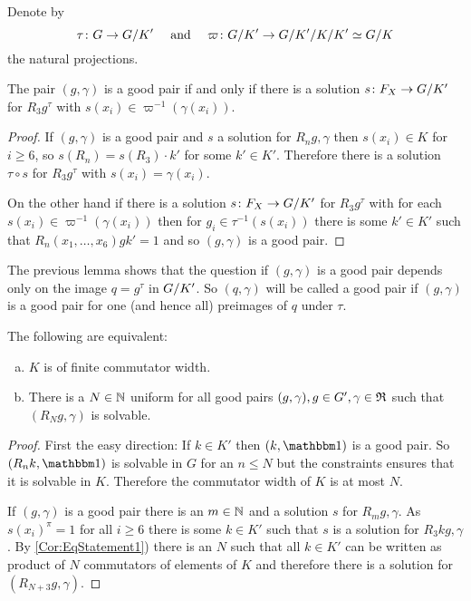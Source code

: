\documentclass[a4paper,11pt]{amsart}
\begin{document}
\begin{lem}
 Denote by 
 \[\tau\colon G\to{G/K'}\quad\text{ and }\quad\varpi\colon {G/K'} \to {{G/K'}/{K/K'}}\simeq {G/K}\]
 the natural projections.
 
 The pair $(g,\gamma)$ is a good pair if and only if there is a solution $s\colon F_X \to {G/K'}$ for $R_3g^\tau$ with $s(x_i) \in \varpi^{-1}(\gamma(x_i))$. 
\end{lem}
\begin{proof}
 If $(g,\gamma)$ is a good pair and $s$ a solution for $R_ng,\gamma$ 
 then $s(x_i)\in K$ for $i\geq6$, so $s(R_n) = s(R_3) \cdot k'$ for some $k'\in K'$. 
 Therefore there is a solution $\tau\circ s$ for $R_3g^\tau$ with $s(x_i) = \gamma(x_i)$.
 
 On the other hand if there is a solution $s\colon F_X \to {G/K'}$ for $R_3g^\tau$ with for each $s(x_i) \in \varpi^{-1}(\gamma(x_i))$ then
 for $g_i \in \tau^{-1}(s(x_i))$ there is some $k'\in K'$ such that $R_n(x_1,\ldots,x_6)gk'=1$ and so $(g,\gamma)$ is a good pair.
\end{proof}
The previous lemma shows that the question if $(g,\gamma)$ is a good pair depends only on the image $q=g^\tau$ in ${G/K'}$. So 
$(q,\gamma)$ will be called a good pair if $(g,\gamma)$ is a good pair for one (and hence all) preimages of $q$ under $\tau$.
\begin{cor}\label{cor:finiteCommutatorWidthKimpliesBoundedConstraintedCommutators}
The following are equivalent:
\begin{enumerate}[a)]
 \item $K$ is of finite commutator width. \label{Cor:EqStatement1}
 \item There is a $N\in\mathbb{N}$ uniform for all good pairs $(g,\gamma),g \in G',\gamma\in\mathfrak{R}$ such that $(R_Ng,\gamma)$ is solvable.
\end{enumerate}
\end{cor}
\begin{proof}
 First the easy direction: If $k\in K'$ then $(k,\id)$ is a good pair. So $(R_nk,\id)$ is solvable in $G$ for an $n\leq N$ but the constraints ensures that it is solvable in $K$.
 Therefore the commutator width of $K$ is at most $N$.
 
 If $(g,\gamma)$ is a good pair there is an $m\in \mathbb{N}$ and a solution $s$ for $R_mg,\gamma$. As $s(x_i)^\pi =1$ for all $i\geq 6$ there is some $k\in K'$ such that $s$ is 
 a solution for $R_3kg,\gamma$. By \ref{Cor:EqStatement1}) there is an $N$ such that all $k\in K'$ can be written as product of $N$ commutators of elements of $K$ and
 therefore there is a solution for $(R_{N+3}g,\gamma)$.
\end{proof}
\end{document}
